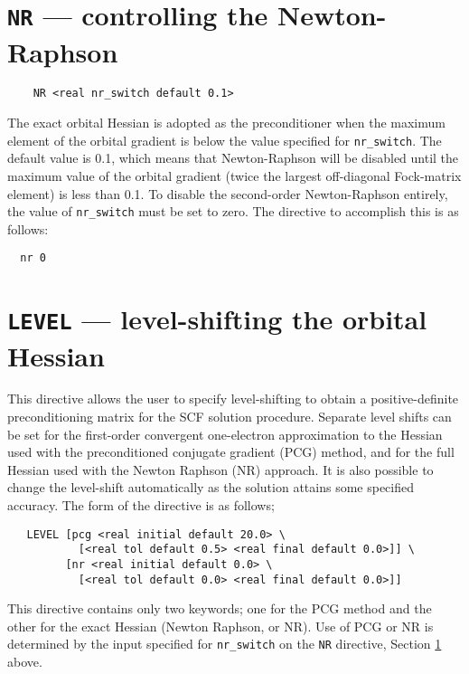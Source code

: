 \section{{\tt NR} --- controlling the Newton-Raphson}
\label{sec:nrswitch}

\begin{verbatim}
    NR <real nr_switch default 0.1>
\end{verbatim}

The exact orbital Hessian is adopted as the preconditioner when the
maximum element of the orbital gradient is below the value specified
for \verb+nr_switch+.  The default value is 0.1, which means that
Newton-Raphson will be disabled until the maximum value of the orbital
gradient (twice the largest off-diagonal Fock-matrix element) is less
than 0.1.   To disable the second-order Newton-Raphson entirely, the
value of \verb+nr_switch+ must be set to zero.  The directive to accomplish
this is as follows:
\begin{verbatim}
  nr 0
\end{verbatim}

\section{{\tt LEVEL} --- level-shifting the orbital Hessian}
\label{sec:level}

This directive allows the user to specify level-shifting to obtain a
positive-definite preconditioning matrix for the SCF solution
procedure.  Separate level shifts can be set for the first-order
convergent one-electron approximation to the Hessian used with the
preconditioned conjugate gradient (PCG) method, and for the full
Hessian used with the Newton Raphson (NR) approach.  It is also
possible to change the level-shift automatically as the solution
attains some specified accuracy.  The form of the directive is as
follows;
\begin{verbatim}
   LEVEL [pcg <real initial default 20.0> \
           [<real tol default 0.5> <real final default 0.0>]] \
         [nr <real initial default 0.0> \
           [<real tol default 0.0> <real final default 0.0>]]
\end{verbatim}

This directive contains only two keywords; one for the PCG method and
the other for the exact Hessian (Newton Raphson, or NR).  Use of PCG
or NR is determined by the input specified for \verb+nr_switch+ on the
\verb+NR+ directive, Section \ref{sec:nrswitch} above.  

